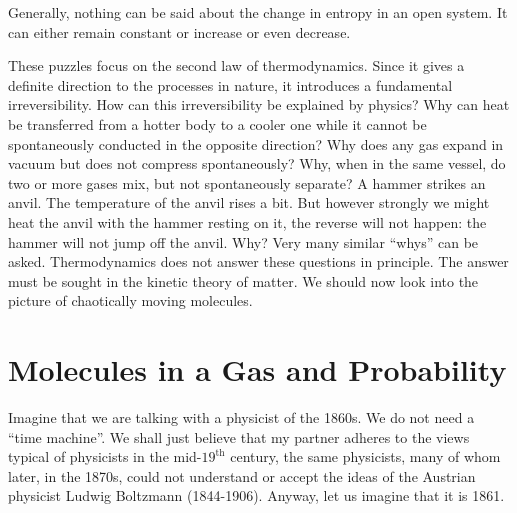  Generally, nothing can be said about the change in entropy in an open system. It can either remain constant or increase or even decrease.

 These puzzles focus on the second law of thermodynamics. Since it gives a definite direction to the processes in nature, it introduces a fundamental irreversibility. How can this irreversibility be explained by physics? Why can heat be transferred from a hotter body to a cooler one while it cannot be spontaneously conducted in the opposite direction? Why does any gas expand in vacuum but does not compress spontaneously? Why, when in the same vessel, do two or more gases mix, but not spontaneously separate? A hammer strikes an anvil. The temperature of the anvil rises a bit. But however strongly we might heat the anvil with the hammer resting on it, the reverse will not happen: the hammer will not jump off the anvil. Why? Very many similar ``whys'' can be asked. Thermodynamics does not answer these questions in principle. The answer must be sought in the kinetic theory of matter. We should now look into the picture of chaotically moving molecules.

\section{Molecules in a Gas and Probability }

 Imagine that we are talking with a physicist of the 1860s. We do not need a ``time machine''. We shall just believe that my partner adheres to the views typical of physicists in the mid-$19^{\text{th}}$ century, the same physicists, many of whom later, in the 1870s, could not understand or accept the ideas of the Austrian physicist Ludwig Boltzmann (1844-1906). Anyway, let us imagine that it is 1861. 

